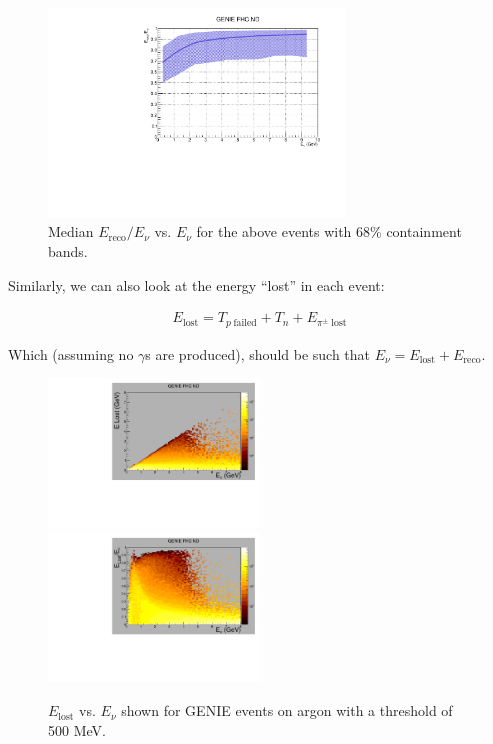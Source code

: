 \documentclass{article}
\begin{document}
\begin{figure}[!h]
  \begin{center}
    \includegraphics[width=0.7\textwidth]{plots.old/fig9.pdf}
    \caption{Median $E_{\mathrm{reco}}/E_\nu$ vs. $E_\nu$ for the above events with $68\%$ containment bands.}
  \end{center}
\end{figure}

Similarly, we can also look at the energy ``lost'' in each event:

\begin{align}
  E_{\mathrm{lost}} = T_{p \; \mathrm{failed}} + T_{n} + E_{\pi^{\pm} \; \mathrm{lost}}
\end{align}

Which (assuming no $\gamma$s are produced), should be such that $E_\nu = E_{\mathrm{lost}} + E_{\mathrm{reco}}$.

\begin{figure}[!h]
  \includegraphics[width=0.5\textwidth]{plots.old/fig10.pdf}
  \includegraphics[width=0.5\textwidth]{plots.old/fig11.pdf}
  \caption{$E_{\mathrm{lost}}$ vs. $E_\nu$ shown for GENIE events on argon with a threshold of 500 MeV.}
\end{figure}
\end{document}
